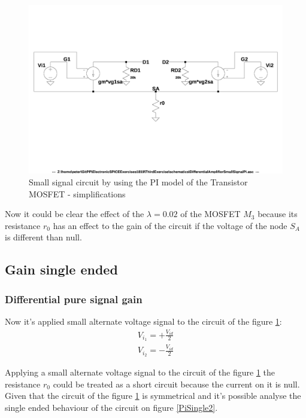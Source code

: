 \begin{figure}[h]
  \centering
  \includegraphics[width=12cm]{schematics/DifferentialAmplifier/SmallSignalPi.jpg}
  \caption{Small signal circuit by using the PI model of the Transistor MOSFET - simplifications}
  \label{PiSimple}
\end{figure}

Now it could be clear the effect of the $\lambda = 0.02$ of the MOSFET $M_3$ because its resistance $r_0$ has an effect to the gain of the circuit if the voltage of the node $S_A$ is different than null.\par

\subsection{Gain single ended}
\subsubsection{Differential pure signal gain}
Now it's applied  small alternate voltage signal to the circuit of the figure \ref{PiSimple}:\\
\begin{align}
V_{i_1} =+ \frac{V_{id}}{2} \label{Vi1d}\\
V_{i_2} =- \frac{V_{id}}{2} \label{Vi2d}
\end{align}


Applying a small alternate voltage signal to the circuit of the figure \ref{PiSimple} the resistance $r_0$ could be treated as a short circuit because the current on it is null.\\
Given that the circuit of the figure \ref{PiSimple} is symmetrical and it's possible analyse the single ended behaviour of the circuit on figure \ref{PiSingle2}.\par

